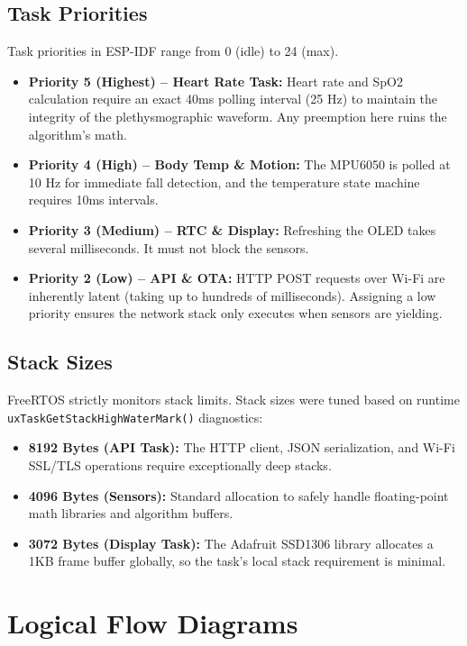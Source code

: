 \documentclass[12pt,a4paper]{report}
\begin{document}
\subsection{Task Priorities}
Task priorities in ESP-IDF range from 0 (idle) to 24 (max).
\begin{itemize}
    \item \textbf{Priority 5 (Highest) -- Heart Rate Task:} Heart rate and SpO2 calculation require an exact 40ms polling interval (25 Hz) to maintain the integrity of the plethysmographic waveform. Any preemption here ruins the algorithm's math.
    \item \textbf{Priority 4 (High) -- Body Temp \& Motion:} The MPU6050 is polled at 10 Hz for immediate fall detection, and the temperature state machine requires 10ms intervals.
    \item \textbf{Priority 3 (Medium) -- RTC \& Display:} Refreshing the OLED takes several milliseconds. It must not block the sensors.
    \item \textbf{Priority 2 (Low) -- API \& OTA:} HTTP POST requests over Wi-Fi are inherently latent (taking up to hundreds of milliseconds). Assigning a low priority ensures the network stack only executes when sensors are yielding.
\end{itemize}

\subsection{Stack Sizes}
FreeRTOS strictly monitors stack limits. Stack sizes were tuned based on runtime \texttt{uxTaskGetStackHighWaterMark()} diagnostics:
\begin{itemize}
    \item \textbf{8192 Bytes (API Task):} The HTTP client, JSON serialization, and Wi-Fi SSL/TLS operations require exceptionally deep stacks.
    \item \textbf{4096 Bytes (Sensors):} Standard allocation to safely handle floating-point math libraries and algorithm buffers.
    \item \textbf{3072 Bytes (Display Task):} The Adafruit SSD1306 library allocates a 1KB frame buffer globally, so the task's local stack requirement is minimal.
\end{itemize}

\section{Logical Flow Diagrams}
\end{document}
